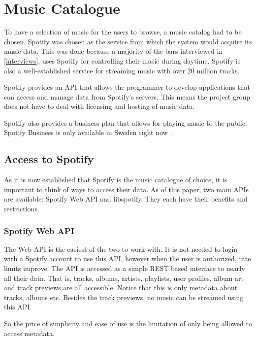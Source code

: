 \section{Music Catalogue}
\label{sec:Music_catalog}
To have a selection of music for the users to browse, a music catalog had to be chosen. Spotify was chosen as the service from which the system would acquire its music data. This was done because a majority of the bars interviewed in \cref{interviews}, uses Spotify for controlling their music during daytime. Spotify is also a well-established service for streaming music with over 20 million tracks.

Spotify provides an API that allows the programmer to develop applications that can access and manage data from Spotify’s servers. This means the project group does not have to deal with licensing and hosting of music data.

Spotify also provides a business plan that allows for playing music to the public. Spotify Business is only available in Sweden right now~\cite{spotifyBusiness}.

\subsection{Access to Spotify}
\label{sub:Access_to_Spotify}

As it is now established that Spotify is the music catalogue of choice, it is important to think of ways to access their data. As of this paper, two main APIs are available: Spotify Web API and libspotify. They each have their benefits and restrictions.

\subsubsection{Spotify Web API}
\label{techPlat:music_catalog_web_api}

The Web API is the easiest of the two to work with. It is not needed to login with a Spotify account to use this API, however when the user is authorized, rate limits improve. The API is accessed as a simple REST based interface to nearly all their data. That is, tracks, albums, artists, playlists, user profiles, album art and track previews are all accessible. Notice that this is only metadata about tracks, albums etc. Besides the track previews, no music can be streamed using this API.

So the price of simplicity and ease of use is the limitation of only being allowed to access metadata.

